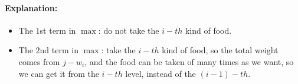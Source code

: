 \begin{parts}
\begin{subparts}
\begin{solution}
			\paragraph{Explanation:}
			\begin{itemize}
				\item The $1$st term in $\max$: do not take the $i-th$ kind of food.
				\item The $2$nd term in $\max$: take the $i-th$ kind of food, so the total weight comes from $j-w_i$, and the food can be taken of many
				times as we want, so we can get it from the $i-th$ level, instead of the $(i-1)-th$.
			\end{itemize}
		\end{solution}
	\end{subparts}
	
\end{parts}